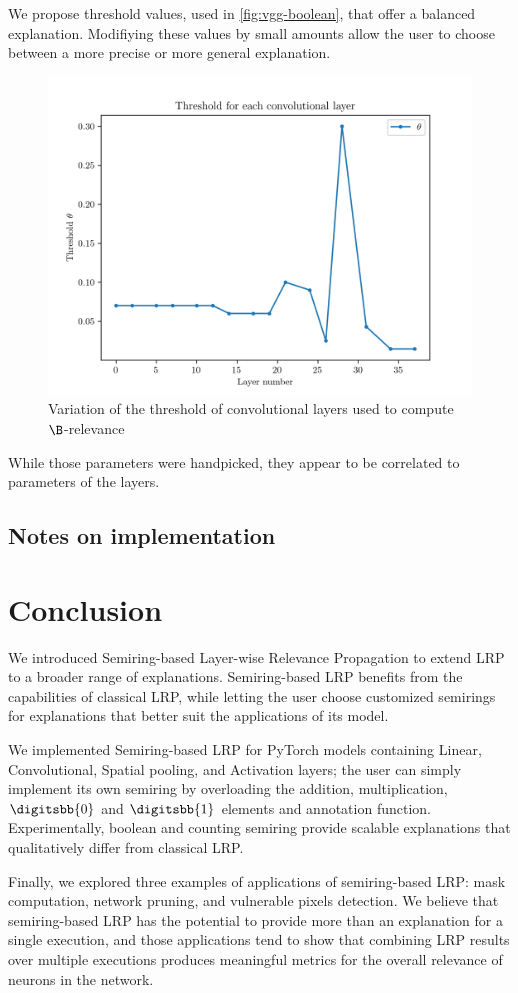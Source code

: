 \documentclass{../cs-classes/cs-classes}
\newcommand*{\1}{\digitsbb{1}}
\newcommand*{\0}{\digitsbb{0}}
\begin{document}
We propose threshold values, used in \autoref{fig:vgg-boolean}, that offer a balanced explanation. Modifiying these values by small amounts allow the user to choose between a more precise or more general explanation.
\begin{figure}[H]
    \centering
    \includegraphics[width=.6\textwidth]{threshold-graph.png}
    \caption{Variation of the threshold of convolutional layers used to compute $\B$-relevance}
\end{figure}

While those parameters were handpicked, they appear to be correlated to parameters of the layers.


\subsection{Notes on implementation}


\section{Conclusion}
We introduced Semiring-based Layer-wise Relevance Propagation to extend LRP to a broader range of explanations. Semiring-based LRP benefits from the capabilities of classical LRP, while letting the user choose customized semirings for explanations that better suit the applications of its model. 

We implemented Semiring-based LRP for PyTorch models containing Linear, Convolutional, Spatial pooling, and Activation layers; the user can simply implement its own semiring by overloading the addition, multiplication, $\0$ and $\1$ elements and annotation function. Experimentally, boolean and counting semiring provide scalable explanations that qualitatively differ from classical LRP.

Finally, we explored three examples of applications of semiring-based LRP: mask computation, network pruning, and vulnerable pixels detection. We believe that semiring-based LRP has the potential to provide more than an explanation for a single execution, and those applications tend to show that combining LRP results over multiple executions produces meaningful metrics for the overall relevance of neurons in the network. 
\end{document}
